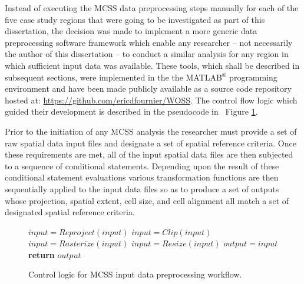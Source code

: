 Instead of executing the MCSS data preprocessing steps manually for each of the five case study regions that were going to be investigated as part of this dissertation, the decision was made to implement a more generic data preprocessing software framework which enable any researcher -- not necessarily the author of this dissertation --  to conduct a similar analysis for any region in which sufficient input data was available. These tools, which shall be described in subsequent sections, were implemented in the the MATLAB$^{\circledR}$ programming environment and have been made publicly available as a source code repository hosted at: \url{https://github.com/ericdfournier/WOSS}. The control flow logic which guided their development is described in the pseudocode in ~Figure \ref{fig:Pseudocode}.

Prior to the initiation of any MCSS analysis the researcher must provide a set of raw spatial data input files and designate a set of spatial reference criteria. Once these requirements are met, all of the input spatial data files are then subjected to a sequence of conditional statements. Depending upon the result of these conditional statement evaluations various transformation functions are then sequentially applied to the input data files so as to produce a set of outputs whose projection, spatial extent, cell size, and cell alignment all match a set of designated spatial reference criteria.

        \begin{figure}[!h]
        \begin{centering}
        \label{euclid}
            \begin{algorithmic}[1]
            
                            \State $input = Reproject(input)$
                            \State $input = Clip(input)$
                            \State $input = Rasterize(input)$
                            \State $input = Resize(input)$
                        \EndIf
                        \State $output = input$
                    \EndFor
                    \State \textbf{return} $output$
                    
                \EndProcedure
            \end{algorithmic}
        \end{centering}
        \caption{Control logic for MCSS input data preprocessing workflow.}
        \label{fig:Pseudocode}
        \end{figure}
            
